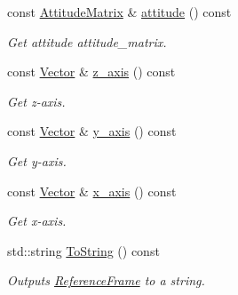 \begin{DoxyCompactItemize}
const \hyperlink{classosse_1_1collaborate_1_1_attitude_matrix}{Attitude\+Matrix} \& \hyperlink{classosse_1_1collaborate_1_1_reference_frame_a518335e6d01a2b8c50f00402818d22b9}{attitude} () const
\begin{DoxyCompactList}\small\item\em Get attitude attitude\+\_\+matrix. \end{DoxyCompactList}\item 
const \hyperlink{classosse_1_1collaborate_1_1_vector}{Vector} \& \hyperlink{classosse_1_1collaborate_1_1_reference_frame_ad3fcddd11a85e828e7de51b333bdf12b}{z\+\_\+axis} () const
\begin{DoxyCompactList}\small\item\em Get z-\/axis. \end{DoxyCompactList}\item 
const \hyperlink{classosse_1_1collaborate_1_1_vector}{Vector} \& \hyperlink{classosse_1_1collaborate_1_1_reference_frame_ae37a2e46a6ed1868a12829e461e6e423}{y\+\_\+axis} () const
\begin{DoxyCompactList}\small\item\em Get y-\/axis. \end{DoxyCompactList}\item 
const \hyperlink{classosse_1_1collaborate_1_1_vector}{Vector} \& \hyperlink{classosse_1_1collaborate_1_1_reference_frame_ac2b2705500ac17535e5ec8127684b449}{x\+\_\+axis} () const
\begin{DoxyCompactList}\small\item\em Get x-\/axis. \end{DoxyCompactList}\item 
std\+::string \hyperlink{classosse_1_1collaborate_1_1_reference_frame_ae5b5e9f9dcb5841fbeb910402afc3b77}{To\+String} () const
\begin{DoxyCompactList}\small\item\em Outputs \hyperlink{classosse_1_1collaborate_1_1_reference_frame}{Reference\+Frame} to a string. \end{DoxyCompactList}\end{DoxyCompactItemize}
